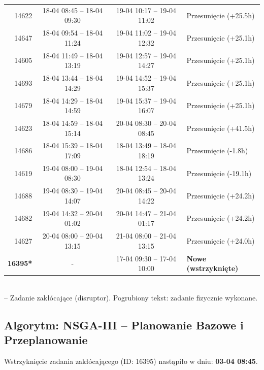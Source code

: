 \begin{table}[htbp]
\begin{tabular}{|r|c|c|l|}
14622 & 18-04 08:45 -- 18-04 09:30 & 19-04 10:17 -- 19-04 11:02 & Przesunięcie (+25.5h) \\ 
14647 & 18-04 09:54 -- 18-04 11:24 & 19-04 11:02 -- 19-04 12:32 & Przesunięcie (+25.1h) \\ 
14605 & 18-04 11:49 -- 18-04 13:19 & 19-04 12:57 -- 19-04 14:27 & Przesunięcie (+25.1h) \\ 
14693 & 18-04 13:44 -- 18-04 14:29 & 19-04 14:52 -- 19-04 15:37 & Przesunięcie (+25.1h) \\ 
14679 & 18-04 14:29 -- 18-04 14:59 & 19-04 15:37 -- 19-04 16:07 & Przesunięcie (+25.1h) \\ 
14623 & 18-04 14:59 -- 18-04 15:14 & 20-04 08:30 -- 20-04 08:45 & Przesunięcie (+41.5h) \\ 
14686 & 18-04 15:39 -- 18-04 17:09 & 18-04 13:49 -- 18-04 18:19 & Przesunięcie (-1.8h) \\ 
14619 & 19-04 08:00 -- 19-04 08:30 & 18-04 12:54 -- 18-04 13:24 & Przesunięcie (-19.1h) \\ 
14688 & 19-04 08:30 -- 19-04 14:07 & 20-04 08:45 -- 20-04 14:22 & Przesunięcie (+24.2h) \\ 
14682 & 19-04 14:32 -- 20-04 01:02 & 20-04 14:47 -- 21-04 01:17 & Przesunięcie (+24.2h) \\ 
14627 & 20-04 08:00 -- 20-04 13:15 & 21-04 08:00 -- 21-04 13:15 & Przesunięcie (+24.0h) \\ 
\hline
\textbf{16395*} & - & 17-04 09:30 -- 17-04 10:00 & \textbf{Nowe (wstrzyknięte)} \\ 
\hline
\end{tabular}
\\ {\footnotesize * -- Zadanie zakłócające (disruptor). Pogrubiony tekst: zadanie fizycznie wykonane.}
\end{table}

\vspace{0.8cm}
\subsection{Algorytm: NSGA-III -- Planowanie Bazowe i Przeplanowanie}

Wstrzyknięcie zadania zakłócającego (ID: 16395) nastąpiło w dniu: \textbf{03-04 08:45}.

